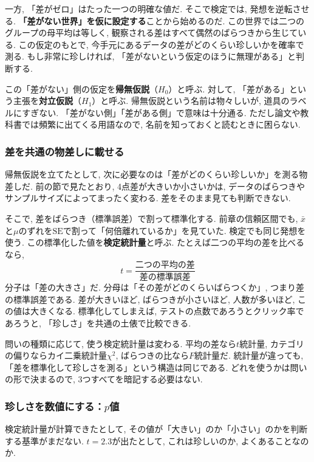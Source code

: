     一方, 「差がゼロ」はたった一つの明確な値だ.
    そこで検定では, 発想を逆転させる.
    \textbf{「差がない世界」を仮に設定する}ことから始めるのだ.
    この世界では二つのグループの母平均は等しく, 観察される差はすべて偶然のばらつきから生じている.
    この仮定のもとで, 今手元にあるデータの差がどのくらい珍しいかを確率で測る.
    もし非常に珍しければ, 「差がないという仮定のほうに無理がある」と判断する.

    この「差がない」側の仮定を\textbf{帰無仮説}（$H_0$）と呼ぶ.
    対して, 「差がある」という主張を\textbf{対立仮説}（$H_1$）と呼ぶ.
    帰無仮説という名前は物々しいが, 道具のラベルにすぎない.
    「差がない側」「差がある側」で意味は十分通る.
    ただし論文や教科書では頻繁に出てくる用語なので, 名前を知っておくと読むときに困らない.

    \subsubsection*{差を共通の物差しに載せる}

    帰無仮説を立てたとして, 次に必要なのは「差がどのくらい珍しいか」を測る物差しだ.
    前の節で見たとおり, 4点差が大きいか小さいかは, データのばらつきやサンプルサイズによってまったく変わる.
    差をそのまま見ても判断できない.

    そこで, 差をばらつき（標準誤差）で割って標準化する.
    前章の信頼区間でも, $\bar{x}$と$\mu$のずれを$\mathrm{SE}$で割って「何倍離れているか」を見ていた.
    検定でも同じ発想を使う.
    この標準化した値を\textbf{検定統計量}と呼ぶ.
    たとえば二つの平均の差を比べるなら,
    \[
      t = \frac{\text{二つの平均の差}}{\text{差の標準誤差}}
    \]
    分子は「差の大きさ」だ.
    分母は「その差がどのくらいばらつくか」, つまり差の標準誤差である.
    差が大きいほど, ばらつきが小さいほど, 人数が多いほど, この値は大きくなる.
    標準化してしまえば, テストの点数であろうとクリック率であろうと, 「珍しさ」を共通の土俵で比較できる.

    問いの種類に応じて, 使う検定統計量は変わる.
    平均の差なら$t$統計量, カテゴリの偏りならカイ二乗統計量$\chi^2$, ばらつきの比なら$F$統計量だ.
    統計量が違っても, 「差を標準化して珍しさを測る」という構造は同じである.
    どれを使うかは問いの形で決まるので, 3つすべてを暗記する必要はない.

    \subsubsection*{珍しさを数値にする：$p$値}

    検定統計量が計算できたとして, その値が「大きい」のか「小さい」のかを判断する基準がまだない.
    $t = 2.3$が出たとして, これは珍しいのか, よくあることなのか.

